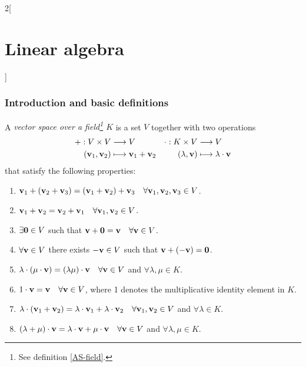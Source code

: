 \documentclass[../../../main.tex]{subfiles}
\begin{document}
\begin{multicols}{2}[\section{Linear algebra}]
  \subsubsection{Introduction and basic definitions}
  \begin{definition}
    A \textit{vector space over a field\footnote{See definition \ref{AS-field}.} $K$} is a set $V$ together with two operations
    \begin{align*}
      +:V\times V                                 & \longrightarrow V                                      & \cdot:K\times V              & \longrightarrow V                           \\
      (\boldsymbol{\mathrm{v}}_1,\boldsymbol{\mathrm{v}}_2) & \longmapsto \boldsymbol{\mathrm{v}}_1+ \boldsymbol{\mathrm{v}}_2 & (\lambda,\boldsymbol{\mathrm{v}}) & \longmapsto \lambda\cdot \boldsymbol{\mathrm{v}}
    \end{align*}
    that satisfy the following properties:
    \begin{enumerate}
      \item $\boldsymbol{\mathrm{v}}_1+(\boldsymbol{\mathrm{v}}_2+\boldsymbol{\mathrm{v}}_3)=(\boldsymbol{\mathrm{v}}_1+\boldsymbol{\mathrm{v}}_2)+\boldsymbol{\mathrm{v}}_3\quad\forall\boldsymbol{\mathrm{v}}_1,\boldsymbol{\mathrm{v}}_2,\boldsymbol{\mathrm{v}}_3\in V$.
      \item $\boldsymbol{\mathrm{v}}_1+\boldsymbol{\mathrm{v}}_2=\boldsymbol{\mathrm{v}}_2+\boldsymbol{\mathrm{v}}_1\quad\forall\boldsymbol{\mathrm{v}}_1,\boldsymbol{\mathrm{v}}_2\in V$.
      \item $\exists\boldsymbol{\mathrm{0}}\in V$ such that $\boldsymbol{\mathrm{v}}+\boldsymbol{\mathrm{0}}=\boldsymbol{\mathrm{v}}\quad\forall\boldsymbol{\mathrm{v}}\in V$.
      \item $\forall\boldsymbol{\mathrm{v}}\in V$ there exists $-\boldsymbol{\mathrm{v}}\in V$ such that $\boldsymbol{\mathrm{v}}+(-\boldsymbol{\mathrm{v}})=\boldsymbol{\mathrm{0}}$.
      \item $\lambda\cdot(\mu\cdot\boldsymbol{\mathrm{v}})=(\lambda\mu)\cdot\boldsymbol{\mathrm{v}}\quad\forall\boldsymbol{\mathrm{v}}\in V$ and $\forall\lambda,\mu\in K$.
      \item $1\cdot\boldsymbol{\mathrm{v}}=\boldsymbol{\mathrm{v}}\quad\forall\boldsymbol{\mathrm{v}}\in V$, where 1 denotes the multiplicative identity element in $K$.
      \item $\lambda\cdot(\boldsymbol{\mathrm{v}}_1+\boldsymbol{\mathrm{v}}_2)=\lambda\cdot\boldsymbol{\mathrm{v}}_1+\lambda\cdot\boldsymbol{\mathrm{v}}_2\quad\forall\boldsymbol{\mathrm{v}}_1,\boldsymbol{\mathrm{v}}_2\in V$ and $\forall\lambda\in K$.
      \item $(\lambda+\mu)\cdot\boldsymbol{\mathrm{v}}=\lambda\cdot\boldsymbol{\mathrm{v}}+\mu\cdot\boldsymbol{\mathrm{v}}\quad\forall\boldsymbol{\mathrm{v}}\in V$ and $\forall\lambda,\mu\in K$.

\end{enumerate}
\end{definition}
\end{multicols}
\end{document}
